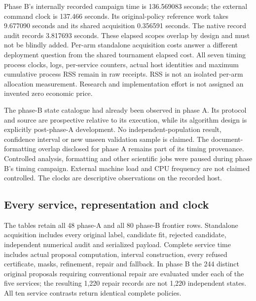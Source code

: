 Phase B's internally recorded campaign time is 136.569083 seconds; the
external command clock is 137.466 seconds.  Its original-policy reference
work takes 9.677090 seconds and its shared acquisition 0.356591 seconds.
The native record audit records 3.817693 seconds.  These elapsed scopes
overlap by design and must not be blindly added.  Per-arm standalone
acquisition costs answer a different deployment question from the shared
tournament elapsed cost.  All seven timing process clocks, logs,
per-service counters, actual host identities and maximum cumulative
process RSS remain in raw receipts.  RSS is not an isolated per-arm
allocation measurement.  Research and implementation effort is not
assigned an invented zero economic price.

The phase-B state catalogue had already been observed in phase A.
Its protocol and source are prospective relative to its execution,
while its algorithm design is explicitly post-phase-A development.
No independent-population result, confidence interval or new unseen
validation sample is claimed.  The document-formatting overlap disclosed
for phase A remains part of its timing provenance.  Controlled analysis,
formatting and other scientific jobs were paused during phase B's
timing campaign.  External machine load and CPU frequency are not claimed
controlled.  The clocks are descriptive observations on the recorded host.

\subsection{Every service, representation and clock}
The tables retain all 48 phase-A and all 80 phase-B frontier rows.
Standalone acquisition includes every original label, candidate fit,
rejected candidate, independent numerical audit and serialized payload.
Complete service time includes actual proposal computation, interval
construction, every refused certificate, masks, refinement, repair and
fallback.  In phase B the 244 distinct original proposals requiring
conventional repair are evaluated under each of the five services; the
resulting 1,220 repair records are not 1,220 independent states.
All ten service contrasts return identical complete policies.






